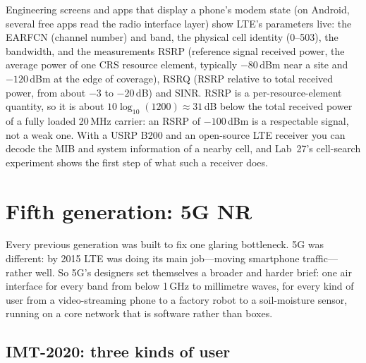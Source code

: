 \begin{inpractice}
Engineering screens and apps that display a phone's modem state (on Android, several free apps read
the radio interface layer) show LTE's parameters live: the EARFCN (channel number) and band, the
physical cell identity (0--503), the bandwidth, and the measurements RSRP (reference signal received
power, the average power of one CRS resource element, typically $-80$\,dBm near a site and
$-120$\,dBm at the edge of coverage), RSRQ (RSRP relative to total received power, from about $-3$ to
$-20$\,dB) and SINR. RSRP is a per-resource-element quantity, so it is about
$10\log_{10}(1200)\approx31$\,dB below the total received power of a fully loaded 20\,MHz carrier: an
RSRP of $-100$\,dBm is a respectable signal, not a weak one. With a USRP B200 and an open-source LTE
receiver you can decode the MIB and system information of a nearby cell, and Lab~27's cell-search
experiment shows the first step of what such a receiver does.
\end{inpractice}

\section{Fifth generation: 5G NR}
\label{sec:ch21:nr}

Every previous generation was built to fix one glaring bottleneck. 5G was different: by 2015 LTE was
doing its main job---moving smartphone traffic---rather well. So 5G's designers set themselves a
broader and harder brief: one air interface for every band from below 1\,GHz to millimetre waves,
for every kind of user from a video-streaming phone to a factory robot to a soil-moisture sensor,
running on a core network that is software rather than boxes.


\subsection{IMT-2020: three kinds of user}


